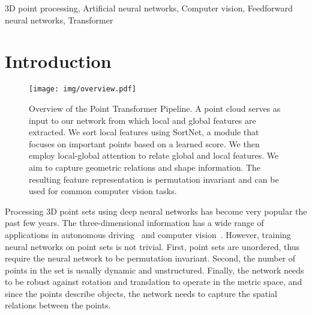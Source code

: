\documentclass{ieeeaccess}
\begin{document}
\begin{keywords}
3D point processing, Artificial neural networks, Computer vision, Feedforward neural networks, Transformer
\end{keywords}

\titlepgskip=-15pt

\maketitle
\copyrightnotice

\section{Introduction}\label{seq:01_intro}
\begin{figure*}[t]
\begin{center}
\texttt{[image: img/overview.pdf]}
\caption{Overview of the Point Transformer Pipeline. A point cloud serves as input to our network from which local and global features are extracted. We sort local features using SortNet, a module that focuses on important points based on a learned score. We then employ local-global attention to relate global and local features. We aim to capture geometric relations and shape information. The resulting feature representation is permutation invariant and can be used for common computer vision tasks. }
    \label{fig:overview}
    \end{center}
\end{figure*}


Processing 3D point sets using deep neural networks has become very popular the past few years. The three-dimensional information has a wide range of applications in autonomous driving~\cite{lang2019pointpillars, engel2018deep, engel2019deeplocalization, simon2020stickypillars, horn2020deepclr, wiederer2020} and computer vision~\cite{qi2017pointnet++,qi2019deep}. However, training neural networks on point sets is not trivial. First, point sets are unordered, thus require the neural network to be permutation invariant. Second, the number of points in the set is usually dynamic and unstructured. Finally, the network needs to be robust against rotation and translation to operate in the metric space, and since the points describe objects, the network needs to capture the spatial relations between the points.
\end{document}
